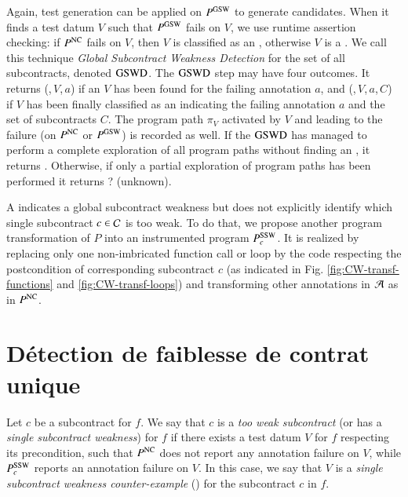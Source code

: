 Again, test generation can be applied on  $P^{\mathrm{GSW}}$ to generate
\GSWCE candidates. When it finds a test datum $V$ such that 
$P^{\mathrm{GSW}}$ fails on $V$, we use runtime assertion checking:
if $P^{\mathrm{NC}}$ fails on $V$, then
$V$ is classified as an \NCCE, otherwise  $V$ is a \GSWCE.
We call this technique \emph{Global Subcontract Weakness Detection} for the set of 
all subcontracts, denoted $\mathrm{GSWD}$. 
The $\mathrm{GSWD}$ step may have four outcomes.
It returns (\nc,\,$V$,\,$a$) if an \NCCE $V$ has been found for the failing
annotation $a$,
and  (\cw,\,$V$,\,$a$,\,$C$) if $V$ has been finally classified as an \SWCE
indicating the failing annotation $a$ and the set of subcontracts $C$.
The program path $\pi_V$ activated by $V$ and leading to the failure 
(on $P^{\mathrm{NC}}$ or $P^{\mathrm{GSW}}$) is recorded as well.
If the $\mathrm{GSWD}$ has managed to perform a complete exploration 
of all program paths without finding an \GSWCE, it returns \no.
Otherwise, if only a partial exploration of program paths
has been performed it returns \textsf{?} (unknown).




A \GSWCE indicates a global subcontract weakness but
does not explicitly identify which single subcontract $c\in{\ensuremath\mathcal{C}}$ is too 
weak.
To do that, we propose another program transformation of $P$ into
an instrumented program  $P_c^{\mathrm{SSW}}$.
It is realized by replacing only one non-imbricated function call or loop 
by the code respecting the postcondition of corresponding subcontract $c$ 
(as indicated in Fig. \ref{fig:CW-transf-functions} and \ref{fig:CW-transf-loops})
and transforming other annotations in ${\mathcal{A}}$ as in $P^{\mathrm{NC}}$.


\section{Détection de faiblesse de contrat unique}
\label{sec:swd-single}


\begin{definition} 
\label{def:SSW}
Let $c$ be a subcontract for $f$.
We say that $c$ is a \emph{too weak subcontract}
(or has a \emph{single subcontract weakness}) for $f$ 
if there exists a test datum $V$ for $f$ respecting its precondition,
such that $P^{\mathrm{NC}}$ does not report any annotation failure on $V$,
while $P_c^{\mathrm{SSW}}$ reports an annotation failure on $V$.
In this case, we say that $V$ is a \emph{single subcontract weakness counter-example} (\SSWCE)
for the subcontract  $c$ in $f$.
\end{definition}

